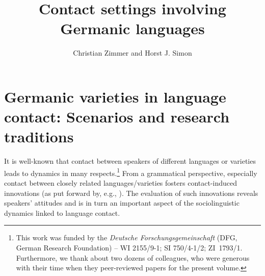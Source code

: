\documentclass[output=paper]{langsci/langscibook}
\author{Christian Zimmer\affiliation{Freie Universität Berlin} and Horst J. Simon\affiliation{Freie Universität Berlin}}
\title{Contact settings involving Germanic languages}
\begin{document}
\maketitle

\section{Germanic varieties in language contact: Scenarios and research traditions} %
\label{sec:zimmer:1}

It is well-known that contact between speakers of different languages or varieties leads to dynamics in many respects.\footnote{This work was funded by the \textit{Deutsche Forschungsgemeinschaft} (DFG, German Research Foundation) – WI 2155/9-1; SI 750/4-1/2; ZI~1793/1. Furthermore, we thank about two dozens of colleagues, who were generous with their time when they peer-reviewed papers for the present volume.} From a grammatical perspective, especially contact between closely related languages/varieties fosters contact-induced innovations (as put forward by, e.g., \citealt{thomason_contact-induced_2014}). The evaluation of such innovations reveals speakers’ attitudes and is in turn an important aspect of the sociolinguistic dynamics linked to language contact. 
\end{document}
